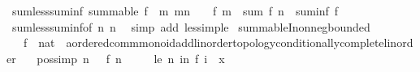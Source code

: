 \begin{isabellebody}
\endisatagproof
{\isafoldproof}%
%
\isadelimproof
\isanewline
%
\endisadelimproof
\isanewline
{}\isamarkupfalse%
\ sum{\isacharunderscore}{\kern0pt}less{\isacharunderscore}{\kern0pt}suminf{\isacharcolon}{\kern0pt}\ {\isachardoublequoteopen}summable\ f\ {\isasymLongrightarrow}\ {\isacharparenleft}{\kern0pt}{\isasymAnd}m{\isachardot}{\kern0pt}\ m{\isasymge}n\ {\isasymLongrightarrow}\ {}\ {\isacharless}{\kern0pt}\ f\ m{\isacharparenright}{\kern0pt}\ {\isasymLongrightarrow}\ sum\ f\ {\isacharbraceleft}{\kern0pt}{\isachardot}{\kern0pt}{\isachardot}{\kern0pt}{\isacharless}{\kern0pt}n{\isacharbraceright}{\kern0pt}\ {\isacharless}{\kern0pt}\ suminf\ f{\isachardoublequoteclose}\isanewline
%
\isadelimproof
\ \ %
\endisadelimproof
%
\isatagproof
{}\isamarkupfalse%
\ sum{\isacharunderscore}{\kern0pt}less{\isacharunderscore}{\kern0pt}suminf{}{\isacharbrackleft}{\kern0pt}of\ n\ n{\isacharbrackright}{\kern0pt}\ \isamarkupfalse%
\ {\isacharparenleft}{\kern0pt}simp\ add{\isacharcolon}{\kern0pt}\ less{\isacharunderscore}{\kern0pt}imp{\isacharunderscore}{\kern0pt}le{\isacharparenright}{\kern0pt}%
\endisatagproof
{\isafoldproof}%
%
\isadelimproof
\isanewline
%
\endisadelimproof
\isanewline
{}\isamarkupfalse%
\isanewline
\isanewline
{}\isamarkupfalse%
\ summableI{\isacharunderscore}{\kern0pt}nonneg{\isacharunderscore}{\kern0pt}bounded{\isacharcolon}{\kern0pt}\isanewline
\ \ \ f\ {\isacharcolon}{\kern0pt}{\isacharcolon}{\kern0pt}\ {\isachardoublequoteopen}nat\ {\isasymRightarrow}\ {\isacharprime}{\kern0pt}a{\isacharcolon}{\kern0pt}{\isacharcolon}{\kern0pt}{\isacharbraceleft}{\kern0pt}ordered{\isacharunderscore}{\kern0pt}comm{\isacharunderscore}{\kern0pt}monoid{\isacharunderscore}{\kern0pt}add{\isacharcomma}{\kern0pt}linorder{\isacharunderscore}{\kern0pt}topology{\isacharcomma}{\kern0pt}conditionally{\isacharunderscore}{\kern0pt}complete{\isacharunderscore}{\kern0pt}linorder{\isacharbraceright}{\kern0pt}{\isachardoublequoteclose}\isanewline
\ \ \ pos{\isacharbrackleft}{\kern0pt}simp{\isacharbrackright}{\kern0pt}{\isacharcolon}{\kern0pt}\ {\isachardoublequoteopen}{\isasymAnd}n{\isachardot}{\kern0pt}\ {}\ {\isasymle}\ f\ n{\isachardoublequoteclose}\isanewline
\ \ \ \ \ le{\isacharcolon}{\kern0pt}\ {\isachardoublequoteopen}{\isasymAnd}n{\isachardot}{\kern0pt}\ {\isacharparenleft}{\kern0pt}{\isasymSum}i{\isacharless}{\kern0pt}n{\isachardot}{\kern0pt}\ f\ i{\isacharparenright}{\kern0pt}\ {\isasymle}\ x{\isachardoublequoteclose}\isanewline

\end{isabellebody}

